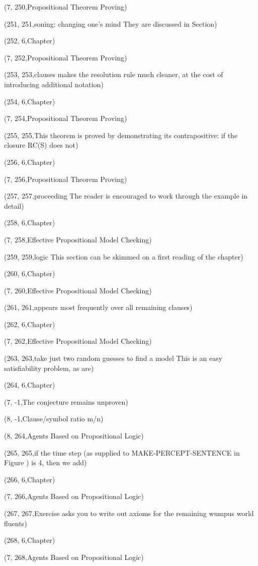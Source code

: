 (7, 250,Propositional Theorem Proving)

(251, 251,soning: changing one’s mind They are discussed in Section)

(252, 6,Chapter)

(7, 252,Propositional Theorem Proving)

(253, 253,clauses makes the resolution rule much cleaner, at the cost of introducing additional notation)

(254, 6,Chapter)

(7, 254,Propositional Theorem Proving)

(255, 255,This theorem is proved by demonstrating its contrapositive: if the closure RC(S) does not)

(256, 6,Chapter)

(7, 256,Propositional Theorem Proving)

(257, 257,proceeding The reader is encouraged to work through the example in detail)

(258, 6,Chapter)

(7, 258,Effective Propositional Model Checking)

(259, 259,logic This section can be skimmed on a ﬁrst reading of the chapter)

(260, 6,Chapter)

(7, 260,Effective Propositional Model Checking)

(261, 261,appears most frequently over all remaining clauses)

(262, 6,Chapter)

(7, 262,Effective Propositional Model Checking)

(263, 263,take just two random guesses to ﬁnd a model This is an easy satisﬁability problem, as are)

(264, 6,Chapter)

(7, -1,The conjecture remains unproven)

(8, -1,Clause/symbol ratio m/n)

(8, 264,Agents Based on Propositional Logic)

(265, 265,if the time step (as supplied to MAKE-PERCEPT-SENTENCE in Figure ) is 4, then we add)

(266, 6,Chapter)

(7, 266,Agents Based on Propositional Logic)

(267, 267,Exercise  asks you to write out axioms for the remaining wumpus world ﬂuents)

(268, 6,Chapter)

(7, 268,Agents Based on Propositional Logic)

